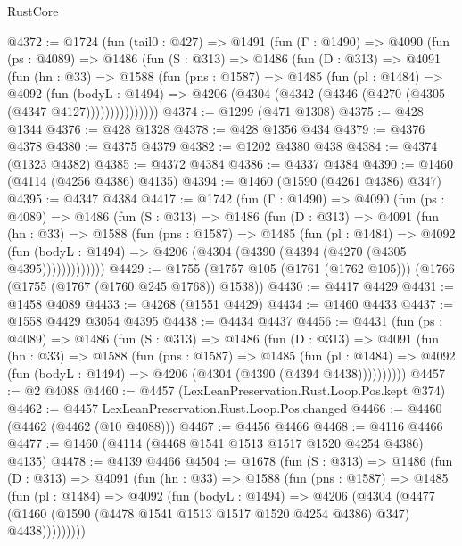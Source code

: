 \begin{lexlean}{RustCore}
\begin{coremodule}
@4372 := @1724
    (fun (tail0 : @427) =>
    @1491
      (fun (Γ : @1490) =>
      @4090
        (fun (ps : @4089) =>
        @1486
          (fun (S : @313) =>
          @1486
            (fun (D : @313) =>
            @4091
              (fun (hn : @33) =>
              @1588
                (fun (pns : @1587) =>
                @1485
                  (fun (pl : @1484) =>
                  @4092
                    (fun (bodyL : @1494) =>
                    @4206 (@4304 (@4342 (@4346 (@4270 (@4305 (@4347 @4127)))))))))))))))
@4374 := @1299 (@471 @1308)
@4375 := @428 @1344
@4376 := @428 @1328
@4378 := @428 @1356 @434
@4379 := @4376 @4378
@4380 := @4375 @4379
@4382 := @1202 @4380 @438
@4384 := @4374 (@1323 @4382)
@4385 := @4372 @4384
@4386 := @4337 @4384
@4390 := @1460 (@4114 (@4256 @4386) @4135)
@4394 := @1460 (@1590 (@4261 @4386) @347)
@4395 := @4347 @4384
@4417 := @1742
    (fun (Γ : @1490) =>
    @4090
      (fun (ps : @4089) =>
      @1486
        (fun (S : @313) =>
        @1486
          (fun (D : @313) =>
          @4091
            (fun (hn : @33) =>
            @1588
              (fun (pns : @1587) =>
              @1485
                (fun (pl : @1484) =>
                @4092
                  (fun (bodyL : @1494) =>
                  @4206 (@4304 (@4390 (@4394 (@4270 (@4305 @4395)))))))))))))
@4429 := @1755 (@1757 @105 (@1761 (@1762 @105))) (@1766 (@1755 (@1767 (@1760 @245 @1768)) @1538))
@4430 := @4417 @4429
@4431 := @1458 @4089
@4433 := @4268 (@1551 @4429)
@4434 := @1460 @4433
@4437 := @1558 @4429 @3054 @4395
@4438 := @4434 @4437
@4456 := @4431
    (fun (ps : @4089) =>
    @1486
      (fun (S : @313) =>
      @1486
        (fun (D : @313) =>
        @4091
          (fun (hn : @33) =>
          @1588
            (fun (pns : @1587) =>
            @1485
              (fun (pl : @1484) =>
              @4092 (fun (bodyL : @1494) => @4206 (@4304 (@4390 (@4394 @4438))))))))))
@4457 := @2 @4088
@4460 := @4457 (LexLeanPreservation.Rust.Loop.Pos.kept @374)
@4462 := @4457 LexLeanPreservation.Rust.Loop.Pos.changed
@4466 := @4460 (@4462 (@4462 (@10 @4088)))
@4467 := @4456 @4466
@4468 := @4116 @4466
@4477 := @1460 (@4114 (@4468 @1541 @1513 @1517 @1520 @4254 @4386) @4135)
@4478 := @4139 @4466
@4504 := @1678
    (fun (S : @313) =>
    @1486
      (fun (D : @313) =>
      @4091
        (fun (hn : @33) =>
        @1588
          (fun (pns : @1587) =>
          @1485
            (fun (pl : @1484) =>
            @4092
              (fun (bodyL : @1494) =>
              @4206
                (@4304
                  (@4477
                    (@1460 (@1590 (@4478 @1541 @1513 @1517 @1520 @4254 @4386) @347) @4438)))))))))

\end{coremodule}
\end{lexlean}
